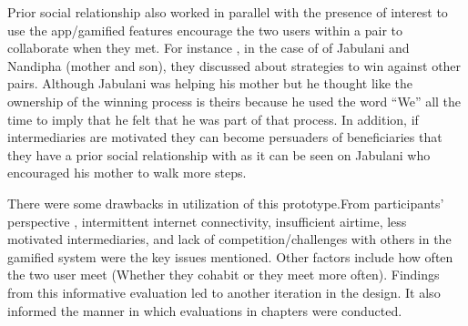Prior social relationship also worked in parallel with the presence of interest to use the app/gamified features  encourage the two users within a pair to collaborate when they met. For instance , in the case of of Jabulani and Nandipha (mother and son), they discussed about strategies to win against other pairs. Although Jabulani was helping his mother but he thought like the ownership of the winning process is theirs because he used the word ``We'' all the time to imply that he felt that he was part of that process. In addition, if intermediaries are motivated they can become persuaders of beneficiaries that they have a prior social relationship with as it can be seen on Jabulani who encouraged his mother to walk more steps.

There were some drawbacks in utilization of this prototype.From participants' perspective , intermittent internet connectivity, insufficient airtime, less motivated intermediaries, and lack of competition/challenges with others in the gamified system were the key issues mentioned. Other factors include how often the two user meet (Whether they cohabit or they meet more often). Findings from this informative evaluation led to another iteration in the design. It also informed the manner in which evaluations in chapters were conducted.
\begin{flushright}
\end{flushright}
